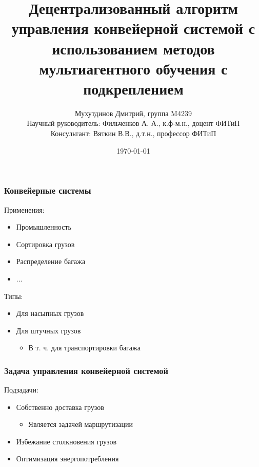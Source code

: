 \documentclass{beamer}
\title[DQN-LE-routing]{
  Децентрализованный алгоритм управления конвейерной системой
  с использованием методов мультиагентного обучения с подкреплением
}
\author[Дмитрий Мухутдинов, М4239]{
  Мухутдинов Дмитрий, группа M4239 \\
  Научный руководитель: Фильченков А. А., к.ф-м.н., доцент ФИТиП \\
  Консультант: Вяткин В.В., д.т.н., профессор ФИТиП
}%
\institute[ИТМО] %
{
  Факультет Информационных Технологий и Программирования \\
  Мегафакультет Трансляционных Информационных Технологий \\
  Университет ИТМО, Санкт-Петербург
}
\date{\today} %
\begin{document}
\frame{\titlepage}


\begin{frame}
  \frametitle{Конвейерные системы}
  Применения:
  \begin{itemize}
  \item Промышленность
  \item Сортировка грузов
  \item Распределение багажа
  \item ...
  \end{itemize}
  Типы:
  \begin{itemize}
  \item Для насыпных грузов
  \item Для штучных грузов
    \begin{itemize}
    \item В т. ч. для транспортировки багажа
    \end{itemize}
  \end{itemize}
\end{frame}


\begin{frame}
  \frametitle{Задача управления конвейерной системой}
  Подзадачи:
  \begin{itemize}
  \item Собственно доставка грузов
    \begin{itemize}
    \item Является задачей маршрутизации
    \end{itemize} 
  \item Избежание столкновения грузов
  \item Оптимизация энергопотребления
  \end{itemize}
\end{frame}
\end{document}
